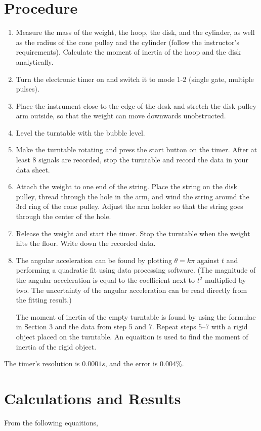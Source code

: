 \documentclass[12pt,a4paper]{article}
\begin{document}
\section{Procedure}
\begin{enumerate}
\item Measure the mass of the weight, the hoop, the disk, and the cylinder, as
  well as the radius of the cone pulley and the cylinder (follow the
  instructor’s requirements). Calculate the moment of inertia of the hoop and
  the disk analytically.
\item Turn the electronic timer on and switch it to mode 1-2 (single gate,
  multiple pulses). 
\item Place the instrument close to the edge of the desk and stretch the disk
  pulley arm outside, so that the weight can move downwards unobstructed. 
\item Level the turntable with the bubble level.
\item Make the turntable rotating and press the start button on the timer. After
  at least 8 signals are recorded, stop the turntable and record the data in
  your data sheet. 
\item Attach the weight to one end of the string. Place the string on the disk
  pulley, thread through the hole in the arm, and wind the string around the 3rd
  ring of the cone pulley. Adjust the arm holder so that the string goes through
  the center of the hole. 
\item Release the weight and start the timer. Stop the turntable when the weight
  hits the floor. Write down the recorded data. 
\item The angular acceleration can be found by plotting $\theta =k\pi$ against
  $t$ and performing a quadratic fit using data processing software. (The
  magnitude of the angular acceleration is equal to the coefficient next to
  $t^2$ multiplied by two. The uncertainty of the angular acceleration can be
  read directly from the fitting result.) 

  The moment of inertia of the empty turntable is found by using the formulae in
  Section 3 and the data from step 5 and 7. Repeat steps 5--7 with a rigid
  object placed on the turntable. An equaition is used to find the moment of
  inertia of the rigid object. 
\end{enumerate}
The timer’s resolution is $0.0001 s$, and the error is $0.004\%$. 

\section{Calculations and Results}
From the following equaitions,
\end{document}
